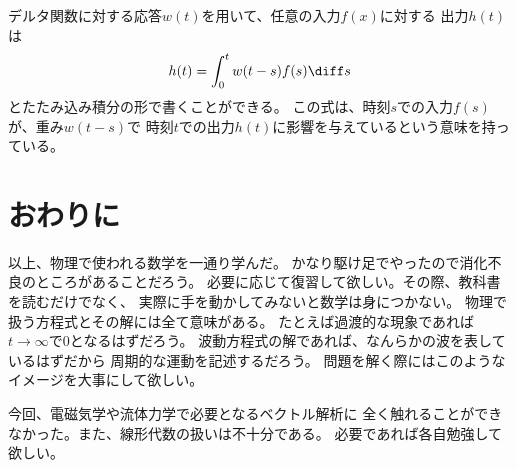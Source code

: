 デルタ関数に対する応答$w(t)$を用いて、任意の入力$f(x)$に対する
出力$h(t)$は
\begin{equation}
  h(t) = \int_0^t w(t-s) f(s) \diff s
\end{equation}
とたたみ込み積分の形で書くことができる。
この式は、時刻$s$での入力$f(s)$が、重み$w(t-s)$で
時刻$t$での出力$h(t)$に影響を与えているという意味を持っている。

\section{おわりに}

以上、物理で使われる数学を一通り学んだ。
かなり駆け足でやったので消化不良のところがあることだろう。
必要に応じて復習して欲しい。その際、教科書を読むだけでなく、
実際に手を動かしてみないと数学は身につかない。
物理で扱う方程式とその解には全て意味がある。
たとえば過渡的な現象であれば$t\rightarrow \infty$で$0$となるはずだろう。
波動方程式の解であれば、なんらかの波を表しているはずだから
周期的な運動を記述するだろう。
問題を解く際にはこのようなイメージを大事にして欲しい。

今回、電磁気学や流体力学で必要となるベクトル解析に
全く触れることができなかった。また、線形代数の扱いは不十分である。
必要であれば各自勉強して欲しい。




